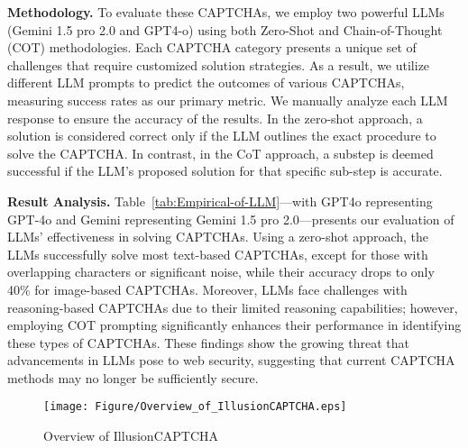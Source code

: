 \noindent \textbf{Methodology.}  To evaluate these CAPTCHAs, we employ two powerful LLMs (Gemini 1.5 pro 2.0 and GPT4-o) using both Zero-Shot and Chain-of-Thought (COT) methodologies. Each CAPTCHA category presents a unique set of challenges that require customized solution strategies. As a result, we utilize different LLM prompts to predict the outcomes of various CAPTCHAs, measuring success rates as our primary metric. We manually analyze each LLM response to ensure the accuracy of the results. In the zero-shot approach, a solution is considered correct only if the LLM outlines the exact procedure to solve the CAPTCHA. In contrast, in the CoT approach, a substep is deemed successful if the LLM's proposed solution for that specific sub-step is accurate.

\noindent\textbf{Result Analysis.} Table~\ref{tab:Empirical-of-LLM}—with GPT4o representing GPT-4o and Gemini representing Gemini 1.5 pro 2.0—presents our evaluation of LLMs' effectiveness in solving CAPTCHAs. Using a zero-shot approach, the LLMs successfully solve most text-based CAPTCHAs, except for those with overlapping characters or significant noise, while their accuracy drops to only 40\% for image-based CAPTCHAs. Moreover, LLMs face challenges with reasoning-based CAPTCHAs due to their limited reasoning capabilities; however, employing COT prompting significantly enhances their performance in identifying these types of CAPTCHAs. These findings show the growing threat that advancements in LLMs pose to web security, suggesting that current CAPTCHA methods may no longer be sufficiently secure.

\begin{center}
    \setlength{\fboxrule}{1pt}
\end{center}


\begin{figure*}[!t]
	\centering
    \texttt{[image: Figure/Overview\_of\_IllusionCAPTCHA.eps]}
	\caption{Overview of IllusionCAPTCHA}
	\label{fig:Illusion-based}
\end{figure*}


